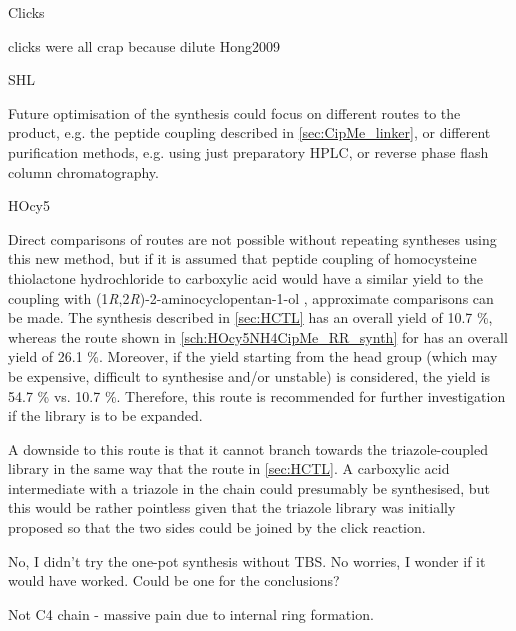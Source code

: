 Clicks

clicks were all crap because dilute Hong2009

SHL

Future optimisation of the synthesis could focus on different routes to the product, e.g. the peptide coupling described in \ref{sec:CipMe_linker}, or different purification methods, e.g. using just preparatory HPLC, or reverse phase flash column chromatography.



HOcy5

Direct comparisons of routes are not possible without repeating syntheses using this new method, but if it is assumed that peptide coupling of homocysteine thiolactone hydrochloride  to carboxylic acid  would have a similar yield to the coupling with (1\textit{R},2\textit{R})-2-aminocyclopentan-1-ol , approximate comparisons can be made.
The synthesis described in \ref{sec:HCTL} has an overall yield of 10.7 \%, whereas the route shown in \ref{sch:HOcy5NH4CipMe_RR_synth} for  has an overall yield of 26.1 \%. Moreover, if the yield starting from the head group (which may be expensive, difficult to synthesise and/or unstable) is considered, the yield is 54.7 \% vs. 10.7 \%.
Therefore, this route is recommended for further investigation if the library is to be expanded.

A downside to this route is that it cannot branch towards the triazole-coupled library in the same way that the route in \ref{sec:HCTL}. A carboxylic acid intermediate with a triazole in the chain could presumably be synthesised, but this would be rather pointless given that the triazole library was initially proposed so that the two sides could be joined by the click reaction.



No, I didn't try the one-pot synthesis without TBS.
No worries, I wonder if it would have worked. Could be one for the conclusions?


Not C4 chain - massive pain due to internal ring formation.

